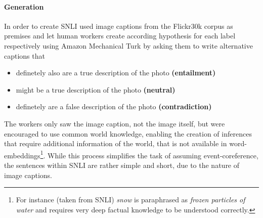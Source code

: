 \paragraph*{Generation}
In order to create \ac{SNLI} \cite{bowman2015large} used image captions from the Flickr30k corpus \citep{young2014image} as premises and let human workers create according hypothesis for each label respectively using Amazon Mechanical Turk by asking them to write alternative captions that
\begin{itemize}
\item definetely also are a true description of the photo  \textbf{(entailment)}
\item might be a true description of the photo \textbf{(neutral)}
\item definetely are a false description of the photo \textbf{(contradiction)}
\end{itemize}
The workers only saw the image caption, not the image itself, but were encouraged to use common world knowledge, enabling the creation of inferences that require additional information of the world, that is not available in word-embeddings\footnote{For instance (taken from \ac{SNLI}) \textit{snow} is paraphrased as \textit{frozen particles of water} and requires very deep factual knowledge to be understood correctly.}. While this process simplifies the task of assuming event-coreference, the sentences within \ac{SNLI} are rather simple and short, due to the nature of image captions. 

